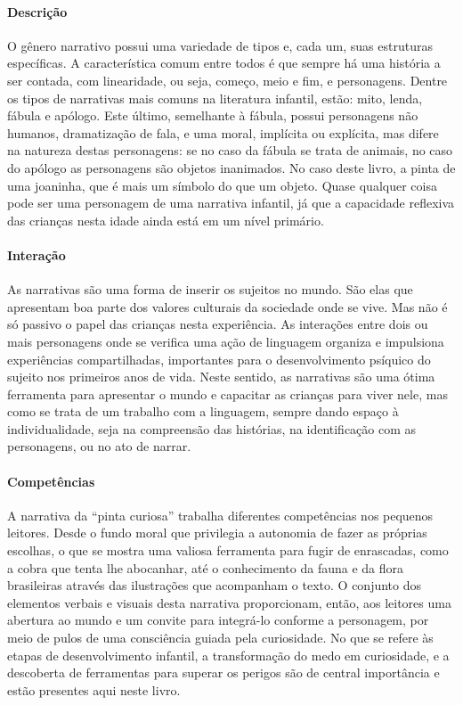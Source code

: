 \documentclass[11pt]{extarticle}
\begin{document}
\paragraph{Descrição} 
O gênero narrativo possui uma variedade de tipos e, cada um, suas estruturas específicas.
A característica comum entre todos é que sempre há uma história a ser contada, com linearidade,
ou seja, começo, meio e fim, e personagens. 
Dentre os tipos de narrativas mais comuns na literatura infantil, estão: mito, lenda, 
fábula e apólogo. Este último, semelhante à fábula, possui personagens não humanos, 
dramatização de fala, e uma moral, implícita ou explícita, mas difere na natureza destas 
personagens: se no caso da fábula se trata de animais, no caso do apólogo as personagens 
são objetos inanimados. No caso deste livro, a pinta de uma joaninha, que é mais um 
símbolo do que um objeto. Quase qualquer coisa pode ser uma personagem de uma narrativa 
infantil, já que a capacidade reflexiva das crianças nesta idade ainda está em um nível primário. 


\paragraph{Interação} 
As narrativas são uma forma de inserir os sujeitos no mundo. 
São elas que apresentam boa parte dos valores culturais da sociedade 
onde se vive. Mas não é só passivo o papel das crianças nesta experiência. 
As interações entre dois ou mais personagens onde se verifica
uma ação de linguagem organiza e impulsiona experiências compartilhadas,
importantes para o desenvolvimento psíquico do sujeito nos primeiros anos de vida.
Neste sentido, as narrativas são uma ótima ferramenta para
apresentar o mundo e capacitar as crianças para viver nele, mas como se
trata de um trabalho com a linguagem, sempre dando espaço à individualidade, 
seja na compreensão das histórias, na identificação com as personagens, ou 
no ato de narrar. 

\paragraph{Competências} 
A narrativa da ``pinta curiosa'' trabalha diferentes competências
nos pequenos leitores. Desde o fundo moral que privilegia a 
autonomia de fazer as próprias escolhas, o que se mostra uma
valiosa ferramenta para fugir de enrascadas, como a cobra que tenta 
lhe abocanhar, até o conhecimento da fauna e da flora brasileiras
através das ilustrações que acompanham o texto. O conjunto dos
elementos verbais e visuais desta narrativa proporcionam, então,
aos leitores uma abertura ao mundo e um convite para integrá-lo 
conforme a personagem, por meio de pulos de uma consciência guiada
pela curiosidade. No que se refere às etapas de desenvolvimento
infantil, a transformação do medo em curiosidade, e a descoberta 
de ferramentas para superar os perigos são de central importância 
e estão presentes aqui neste livro. 
\end{document}
